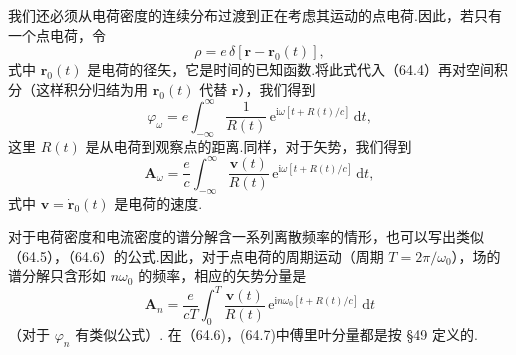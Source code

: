 我们还必须从电荷密度的连续分布过渡到正在考虑其运动的点电荷.因此，若只有一个点电荷，令
\begin{equation*}
  \rho=e\,\delta[\boldsymbol{r}-\boldsymbol{r}_0(t)],
\end{equation*}
式中 $\boldsymbol{r}_0(t)$ 是电荷的径矢，它是时间的已知函数.将此式代入（64.4）再对空间积分（这样积分归结为用 $\boldsymbol{r}_0(t)$ 代替 $\boldsymbol{r}$），我们得到
\begin{equation}
  \varphi_\omega=e\int_{-\infty}^{\infty}\frac{1}{R(t)}\,
  \mathrm{e}^{\mathrm{i}\omega[t+R(t)/c]}\,\mathrm{d}t,
\end{equation}
这里 $R(t)$ 是从电荷到观察点的距离.同样，对于矢势，我们得到
\begin{equation}
  \boldsymbol{A}_\omega=\frac{e}{c}\int_{-\infty}^{\infty}
  \frac{\boldsymbol{v}(t)}{R(t)}\,
  \mathrm{e}^{\mathrm{i}\omega[t+R(t)/c]}\,\mathrm{d}t,
\end{equation}
式中 $\boldsymbol{v}=\dot{\boldsymbol{r}}_0(t)$ 是电荷的速度.

对于电荷密度和电流密度的谱分解含一系列离散频率的情形，也可以写出类似（64.5），（64.6）的公式.因此，对于点电荷的周期运动（周期 $T=2\pi/\omega_0$），场的谱分解只含形如 $n\omega_0$ 的频率，相应的矢势分量是
\begin{equation}
  \boldsymbol{A}_n=\frac{e}{cT}\int_0^{T}
  \frac{\boldsymbol{v}(t)}{R(t)}\,
  \mathrm{e}^{\mathrm{i}n\omega_0[t+R(t)/c]}\,\mathrm{d}t
\end{equation}
（对于 $\varphi_n$ 有类似公式）. 在（64.6)，(64.7)中傅里叶分量都是按 §49 定义的.

